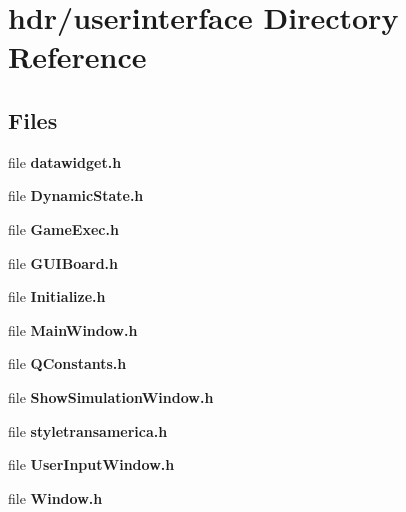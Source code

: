 \section{hdr/userinterface Directory Reference}
\label{dir_5cd1f6435bf62c6a6fa20b8fa16990bc}
\subsection*{Files}
\begin{DoxyCompactItemize}
\item 
file {\bfseries datawidget.\-h}
\item 
file {\bfseries Dynamic\-State.\-h}
\item 
file {\bfseries Game\-Exec.\-h}
\item 
file {\bfseries G\-U\-I\-Board.\-h}
\item 
file {\bfseries Initialize.\-h}
\item 
file {\bfseries Main\-Window.\-h}
\item 
file {\bfseries Q\-Constants.\-h}
\item 
file {\bfseries Show\-Simulation\-Window.\-h}
\item 
file {\bfseries styletransamerica.\-h}
\item 
file {\bfseries User\-Input\-Window.\-h}
\item 
file {\bfseries Window.\-h}
\end{DoxyCompactItemize}
